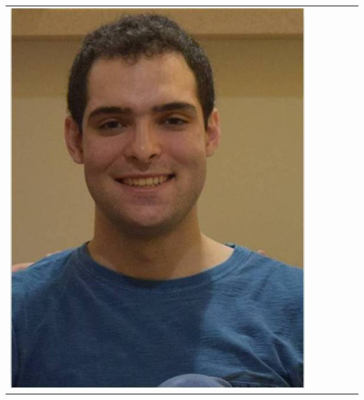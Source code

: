 \documentclass[landscape,a0paper,fontscale=0.292]{baposter}
\begin{document}
\begin{poster}
{\begin{center}
\begin{tabularx}{\linewidth}{X X X X X X}
{\centering \includegraphics[width=0.6\linewidth]{samcerq.jpg}}\\ 


\end{tabularx}
\end{center}}
\end{poster}
\end{document}
